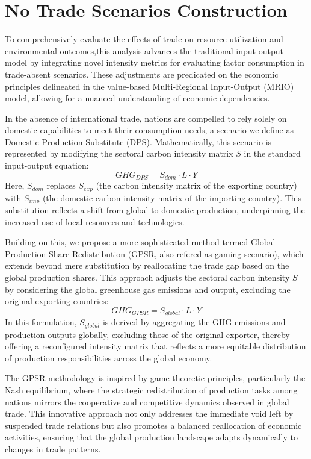 \section{No Trade Scenarios Construction}
To comprehensively evaluate the effects of trade on resource utilization and environmental outcomes,this analysis advances the traditional input-output model by integrating novel intensity metrics for evaluating factor consumption in trade-absent scenarios. These adjustments are predicated on the economic principles delineated in the value-based Multi-Regional Input-Output (MRIO) model, allowing for a nuanced understanding of economic dependencies.

In the absence of international trade, nations are compelled to rely solely on domestic capabilities to meet their consumption needs, a scenario we define as Domestic Production Substitute (DPS). Mathematically, this scenario is represented by modifying the sectoral carbon intensity matrix $S$ in the standard input-output equation:
\begin{equation}
GHG_{DPS} = S_{dom} \cdot L \cdot Y
\label{eq:DPS}
\end{equation}
Here, $S_{dom}$ replaces $S_{exp}$ (the carbon intensity matrix of the exporting country) with $S_{imp}$ (the domestic carbon intensity matrix of the importing country). This substitution reflects a shift from global to domestic production, underpinning the increased use of local resources and technologies.

Building on this, we propose a more sophisticated method termed Global Production Share Redistribution (GPSR, also refered as gaming scenario), which extends beyond mere substitution by reallocating the trade gap based on the global production shares. This approach adjusts the sectoral carbon intensity $S$ by considering the global greenhouse gas emissions and output, excluding the original exporting countries:
\begin{equation}
GHG_{GPSR} = S_{global} \cdot L \cdot Y
\label{eq:GPSR}
\end{equation}
In this formulation, $S_{global}$ is derived by aggregating the GHG emissions and production outputs globally, excluding those of the original exporter, thereby offering a reconfigured intensity matrix that reflects a more equitable distribution of production responsibilities across the global economy.

The GPSR methodology is inspired by game-theoretic principles, particularly the Nash equilibrium, where the strategic redistribution of production tasks among nations mirrors the cooperative and competitive dynamics observed in global trade. This innovative approach not only addresses the immediate void left by suspended trade relations but also promotes a balanced reallocation of economic activities, ensuring that the global production landscape adapts dynamically to changes in trade patterns.

